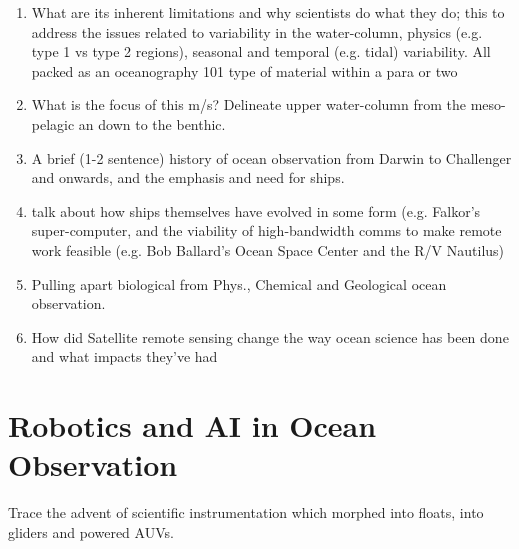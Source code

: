 \documentclass[12pt]{article}
\begin{document}
\begin{enumerate} 



\item What are its inherent limitations and why scientists do what
  they do; this to address the issues related to variability in the
  water-column, physics (e.g. type 1 vs type 2 regions), seasonal and
  temporal (e.g. tidal) variability. All packed as an oceanography 101
  type of material within a para or two

\item What is the focus of this m/s? Delineate upper water-column from the
meso-pelagic an down to the benthic.

\item A brief (1-2 sentence) history of ocean observation from Darwin to
Challenger and onwards, and the emphasis and need for ships.

\item talk about how ships themselves have evolved in some form
  (e.g. Falkor’s super-computer, and the viability of high-bandwidth
  comms to make remote work feasible (e.g. Bob Ballard’s Ocean Space
  Center and the R/V Nautilus)



\item Pulling apart biological from Phys., Chemical and Geological ocean
observation. 

\item How did Satellite remote sensing change the way ocean science has
been done and what impacts they've had

\end{enumerate}

\section{Robotics and AI in Ocean Observation}

Trace the advent of scientific instrumentation which morphed into
floats, into gliders and powered AUVs.
\end{document}
